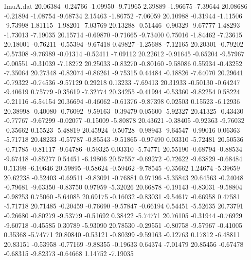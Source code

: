 \begin{filecontents}{ImuA.dat}
  20.06384   -0.24766   -1.09950   -9.71965    2.39889   -1.96675   -7.39644
  20.08686   -0.21894   -1.08754   -9.68734    2.15463   -1.86752   -7.06059
  20.10988   -0.31944   -1.11506   -9.73998    1.81115   -1.98201   -7.03769
  20.13288   -0.51446   -0.90329   -9.67777    1.48293   -1.73013   -7.19035
  20.15714   -0.69870   -0.71665   -9.73400    0.75016   -1.84462   -7.23615
  20.18001   -0.76211   -0.55394   -9.67418    0.49827   -1.25688   -7.12165
  20.20301   -0.79202   -0.57308   -9.76989   -0.01314   -0.52411   -7.09112
  20.22612   -0.91645   -0.65204   -9.57967   -0.00551   -0.31039   -7.18272
  20.25033   -0.83270   -0.80160   -9.58086    0.55934   -0.43252   -7.35064
  20.27348   -0.82074   -0.86261   -9.75315    0.44484   -0.18826   -7.64070
  20.29641   -0.79322   -0.74536   -9.57129    0.29218    0.13233   -7.69413
  20.31933   -0.50130   -0.64247   -9.40619    0.75779   -0.35619   -7.32774
  20.34255   -0.41994   -0.53360   -9.82254    0.58224   -0.21116   -6.54154
  20.36694   -0.46062   -0.61376   -9.87398    0.02503    0.15523   -6.12936
  20.38998   -0.40080   -0.76092   -9.59163   -0.39479    0.05600   -5.92327
  20.41325   -0.43430   -0.77767   -9.67299   -0.02077   -0.15009   -5.80878
  20.43621   -0.38405   -0.92363   -9.76032   -0.35662    0.15523   -5.48819
  20.45924   -0.50728   -0.98943   -9.64547   -0.99016    0.06363   -5.71718
  20.48233   -0.57787   -0.85543   -9.51865   -0.97490    0.03310   -5.72481
  20.50536   -0.71785   -0.81117   -9.64786   -0.59325    0.03310   -5.74771
  20.55190   -0.68794   -0.88534   -9.67418   -0.85277    0.54451   -6.19806
  20.57557   -0.69272   -0.72622   -9.63829   -0.68484    0.51398   -6.10646
  20.59895   -0.58624   -0.59462   -9.78545   -0.35662    1.24674   -5.39659
  20.62238   -0.52403   -0.69511   -9.83091   -0.76881    0.97196   -5.35843
  20.64563   -0.24048   -0.79681   -9.63350   -0.83750    0.97959   -5.32026
  20.66878   -0.19143   -0.83031   -9.58804   -0.98253    0.75060   -5.64085
  20.69175   -0.16032   -0.83031   -9.54617   -0.66958    0.47581   -5.71718
  20.71485   -0.20459   -0.76690   -9.57847   -0.66194    0.54451   -5.52635
  20.73791   -0.26680   -0.80279   -9.53779   -0.51692    0.38422   -5.74771
  20.76105   -0.31944   -0.76929   -9.60718   -0.45585    0.30789   -5.93090
  20.78530   -0.29551   -0.80758   -9.57967   -0.41005    0.35368   -5.74771
  20.80840   -0.53121   -0.80399   -9.59163   -0.12763    0.17812   -6.48811
  20.83151   -0.53958   -0.77169   -9.88355   -0.19633    0.64374   -7.01479
  20.85456   -0.67478   -0.68315   -9.82373   -0.64668    1.14752   -7.19035

\end{filecontents}
